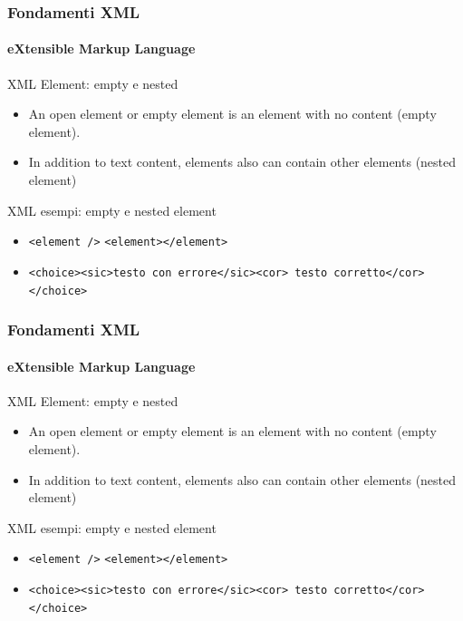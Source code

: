 \begin{frame}
    \frametitle{Fondamenti XML}
    \framesubtitle{eXtensible Markup Language}
    \addtocounter{nframe}{1}

	\begin{block}{XML Element: empty e nested}
		\begin{itemize}
			\item An open element or empty element is an element with no content (empty element).
			\item In addition to text content, elements also can contain other elements (nested element)
		\end{itemize}
	\end{block}

	\begin{block}{XML esempi: empty e nested element}
		\begin{itemize}
			\item \texttt{<element />} \texttt{<element></element>}
			\item \texttt{<choice><sic>testo con errore</sic><cor> testo corretto</cor></choice>}
		\end{itemize}
		
	\end{block}
	
\end{frame}



\begin{frame}
    \frametitle{Fondamenti XML}
    \framesubtitle{eXtensible Markup Language}
    \addtocounter{nframe}{1}

	\begin{block}{XML Element: empty e nested}
		\begin{itemize}
			\item An open element or empty element is an element with no content (empty element).
			\item In addition to text content, elements also can contain other elements (nested element)
		\end{itemize}
	\end{block}

	\begin{block}{XML esempi: empty e nested element}
		\begin{itemize}
			\item \texttt{<element />} \texttt{<element></element>}
			\item \texttt{<choice><sic>testo con errore</sic><cor> testo corretto</cor></choice>}
		\end{itemize}
		
	\end{block}
	
\end{frame}

